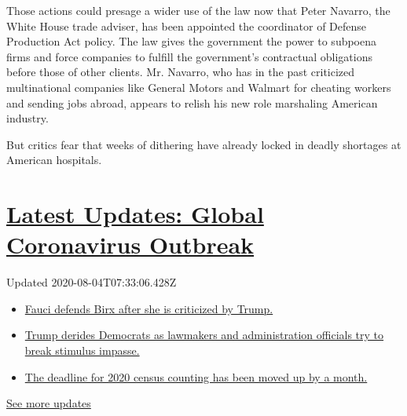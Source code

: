 Those actions could presage a wider use of the law now that Peter
Navarro, the White House trade adviser, has been appointed the
coordinator of Defense Production Act policy. The law gives the
government the power to subpoena firms and force companies to fulfill
the government's contractual obligations before those of other clients.
Mr. Navarro, who has in the past criticized multinational companies like
General Motors and Walmart for cheating workers and sending jobs abroad,
appears to relish his new role marshaling American industry.

But critics fear that weeks of dithering have already locked in deadly
shortages at American hospitals.

\hypertarget{latest-updates-global-coronavirus-outbreak}{%
\section{\texorpdfstring{\href{https://www.nytimes.com/2020/08/03/world/coronavirus-covid-19.html?action=click\&pgtype=Article\&state=default\&region=MAIN_CONTENT_1\&context=storylines_live_updates}{Latest
Updates: Global Coronavirus
Outbreak}}{Latest Updates: Global Coronavirus Outbreak}}\label{latest-updates-global-coronavirus-outbreak}}

Updated 2020-08-04T07:33:06.428Z

\begin{itemize}
\tightlist
\item
  \href{https://www.nytimes.com/2020/08/03/world/coronavirus-covid-19.html?action=click\&pgtype=Article\&state=default\&region=MAIN_CONTENT_1\&context=storylines_live_updates\#link-4547638f}{Fauci
  defends Birx after she is criticized by Trump.}
\item
  \href{https://www.nytimes.com/2020/08/03/world/coronavirus-covid-19.html?action=click\&pgtype=Article\&state=default\&region=MAIN_CONTENT_1\&context=storylines_live_updates\#link-15e7f995}{Trump
  derides Democrats as lawmakers and administration officials try to
  break stimulus impasse.}
\item
  \href{https://www.nytimes.com/2020/08/03/world/coronavirus-covid-19.html?action=click\&pgtype=Article\&state=default\&region=MAIN_CONTENT_1\&context=storylines_live_updates\#link-e5a2cda}{The
  deadline for 2020 census counting has been moved up by a month.}
\end{itemize}

\href{https://www.nytimes.com/2020/08/03/world/coronavirus-covid-19.html?action=click\&pgtype=Article\&state=default\&region=MAIN_CONTENT_1\&context=storylines_live_updates}{See
more updates}

